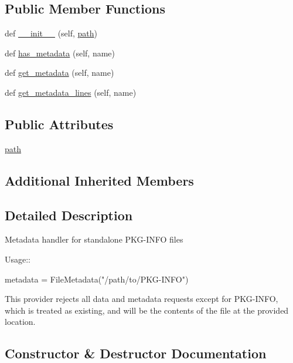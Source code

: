 \subsection*{Public Member Functions}
\begin{DoxyCompactItemize}
\item 
def \hyperlink{classpkg__resources_1_1FileMetadata_a038dfeba0ff764aa85e69708d248e476}{\+\_\+\+\_\+init\+\_\+\+\_\+} (self, \hyperlink{classpkg__resources_1_1FileMetadata_a2855060a8b7e183c33be0b709c9288c7}{path})
\item 
def \hyperlink{classpkg__resources_1_1FileMetadata_a369b72f554a1c35205959814237cb06d}{has\+\_\+metadata} (self, name)
\item 
def \hyperlink{classpkg__resources_1_1FileMetadata_a4a047f462c972090a3d31882f65bb957}{get\+\_\+metadata} (self, name)
\item 
def \hyperlink{classpkg__resources_1_1FileMetadata_a493e91a4a2a75d0b3600ad9f52a148cb}{get\+\_\+metadata\+\_\+lines} (self, name)
\end{DoxyCompactItemize}
\subsection*{Public Attributes}
\begin{DoxyCompactItemize}
\item 
\hyperlink{classpkg__resources_1_1FileMetadata_a2855060a8b7e183c33be0b709c9288c7}{path}
\end{DoxyCompactItemize}
\subsection*{Additional Inherited Members}


\subsection{Detailed Description}
\begin{DoxyVerb}Metadata handler for standalone PKG-INFO files

Usage::

    metadata = FileMetadata("/path/to/PKG-INFO")

This provider rejects all data and metadata requests except for PKG-INFO,
which is treated as existing, and will be the contents of the file at
the provided location.
\end{DoxyVerb}
 

\subsection{Constructor \& Destructor Documentation}
\mbox{\label{classpkg__resources_1_1FileMetadata_a038dfeba0ff764aa85e69708d248e476}} 

